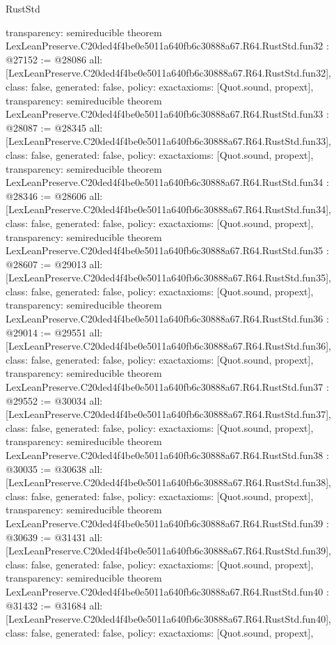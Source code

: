 \begin{lexlean}{RustStd}
\begin{coremodule}
{  transparency: semireducible
}
theorem LexLeanPreserve.C20ded4f4be0e5011a640fb6c30888a67.R64.RustStd.fun32 : @27152 := @28086 {
  all: [LexLeanPreserve.C20ded4f4be0e5011a640fb6c30888a67.R64.RustStd.fun32],
  class: false,
  generated: false,
  policy: exact{axioms: [Quot.sound, propext]},
  transparency: semireducible
}
theorem LexLeanPreserve.C20ded4f4be0e5011a640fb6c30888a67.R64.RustStd.fun33 : @28087 := @28345 {
  all: [LexLeanPreserve.C20ded4f4be0e5011a640fb6c30888a67.R64.RustStd.fun33],
  class: false,
  generated: false,
  policy: exact{axioms: [Quot.sound, propext]},
  transparency: semireducible
}
theorem LexLeanPreserve.C20ded4f4be0e5011a640fb6c30888a67.R64.RustStd.fun34 : @28346 := @28606 {
  all: [LexLeanPreserve.C20ded4f4be0e5011a640fb6c30888a67.R64.RustStd.fun34],
  class: false,
  generated: false,
  policy: exact{axioms: [Quot.sound, propext]},
  transparency: semireducible
}
theorem LexLeanPreserve.C20ded4f4be0e5011a640fb6c30888a67.R64.RustStd.fun35 : @28607 := @29013 {
  all: [LexLeanPreserve.C20ded4f4be0e5011a640fb6c30888a67.R64.RustStd.fun35],
  class: false,
  generated: false,
  policy: exact{axioms: [Quot.sound, propext]},
  transparency: semireducible
}
theorem LexLeanPreserve.C20ded4f4be0e5011a640fb6c30888a67.R64.RustStd.fun36 : @29014 := @29551 {
  all: [LexLeanPreserve.C20ded4f4be0e5011a640fb6c30888a67.R64.RustStd.fun36],
  class: false,
  generated: false,
  policy: exact{axioms: [Quot.sound, propext]},
  transparency: semireducible
}
theorem LexLeanPreserve.C20ded4f4be0e5011a640fb6c30888a67.R64.RustStd.fun37 : @29552 := @30034 {
  all: [LexLeanPreserve.C20ded4f4be0e5011a640fb6c30888a67.R64.RustStd.fun37],
  class: false,
  generated: false,
  policy: exact{axioms: [Quot.sound, propext]},
  transparency: semireducible
}
theorem LexLeanPreserve.C20ded4f4be0e5011a640fb6c30888a67.R64.RustStd.fun38 : @30035 := @30638 {
  all: [LexLeanPreserve.C20ded4f4be0e5011a640fb6c30888a67.R64.RustStd.fun38],
  class: false,
  generated: false,
  policy: exact{axioms: [Quot.sound, propext]},
  transparency: semireducible
}
theorem LexLeanPreserve.C20ded4f4be0e5011a640fb6c30888a67.R64.RustStd.fun39 : @30639 := @31431 {
  all: [LexLeanPreserve.C20ded4f4be0e5011a640fb6c30888a67.R64.RustStd.fun39],
  class: false,
  generated: false,
  policy: exact{axioms: [Quot.sound, propext]},
  transparency: semireducible
}
theorem LexLeanPreserve.C20ded4f4be0e5011a640fb6c30888a67.R64.RustStd.fun40 : @31432 := @31684 {
  all: [LexLeanPreserve.C20ded4f4be0e5011a640fb6c30888a67.R64.RustStd.fun40],
  class: false,
  generated: false,
  policy: exact{axioms: [Quot.sound, propext]},
}
\end{coremodule}
\end{lexlean}

